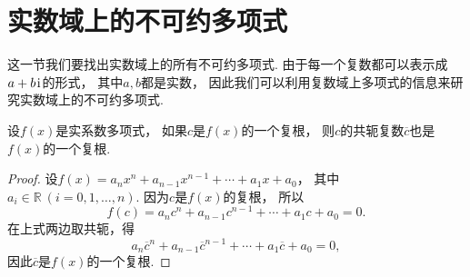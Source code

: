 \section{实数域上的不可约多项式}
这一节我们要找出实数域上的所有不可约多项式.
由于每一个复数都可以表示成\(a+b\kern1pt\mathrm{i}\kern1pt\)的形式，
其中\(a,b\)都是实数，
因此我们可以利用复数域上多项式的信息来研究实数域上的不可约多项式.

\begin{theorem}
设\(f(x)\)是实系数多项式，
如果\(c\)是\(f(x)\)的一个复根，
则\(c\)的共轭复数\(\overline{c}\)也是\(f(x)\)的一个复根.
\begin{proof}
设\(f(x)=a_n x^n+a_{n-1} x^{n-1}+\dotsb+a_1 x+a_0\)，
其中\(a_i\in\mathbb{R}\ (i=0,1,\dotsc,n)\).
因为\(c\)是\(f(x)\)的复根，
所以\[
	f(c)=a_n c^n+a_{n-1} c^{n-1}+\dotsb+a_1 c+a_0=0.
\]
在上式两边取共轭，得\[
	a_n \overline{c}^n+a_{n-1} \overline{c}^{n-1}+\dotsb+a_1 \overline{c}+a_0=0,
\]
因此\(\overline{c}\)是\(f(x)\)的一个复根.
\end{proof}
\end{theorem}

